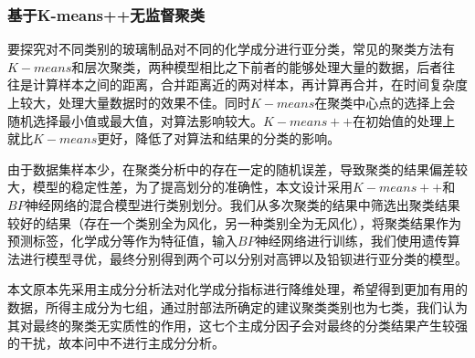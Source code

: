 \documentclass[UTF8]{ctexart}
\begin{document}
                \subsubsection{基于K-means++无监督聚类}
                要探究对不同类别的玻璃制品对不同的化学成分进行亚分类，常见的聚类方法有$K-means$和层次聚类，两种模型相比之下前者的能够处理大量的数据，后者往往是计算样本之间的距离，合并距离近的两对样本，再计算再合并，在时间复杂度上较大，处理大量数据时的效果不佳。同时$K-means$在聚类中心点的选择上会随机选择最小值或最大值，对算法影响较大。$K-means++$在初始值的处理上就比$K-means$更好，降低了对算法和结果的分类的影响。

                由于数据集样本少，在聚类分析中的存在一定的随机误差，导致聚类的结果偏差较大，模型的稳定性差，为了提高划分的准确性，本文设计采用$K-means++$和$BP$神经网络的混合模型进行类别划分。我们从多次聚类的结果中筛选出聚类结果较好的结果（存在一个类别全为风化，另一种类别全为无风化），将聚类结果作为预测标签，化学成分等作为特征值，输入$BP$神经网络进行训练，我们使用遗传算法进行模型寻优，最终分别得到两个可以分别对高钾以及铅钡进行亚分类的模型。

                本文原本先采用主成分分析法对化学成分指标进行降维处理，希望得到更加有用的数据，所得主成分为七组，通过肘部法所确定的建议聚类类别也为七类，我们认为其对最终的聚类无实质性的作用，这七个主成分因子会对最终的分类结果产生较强的干扰，故本问中不进行主成分分析。



\end{document}
